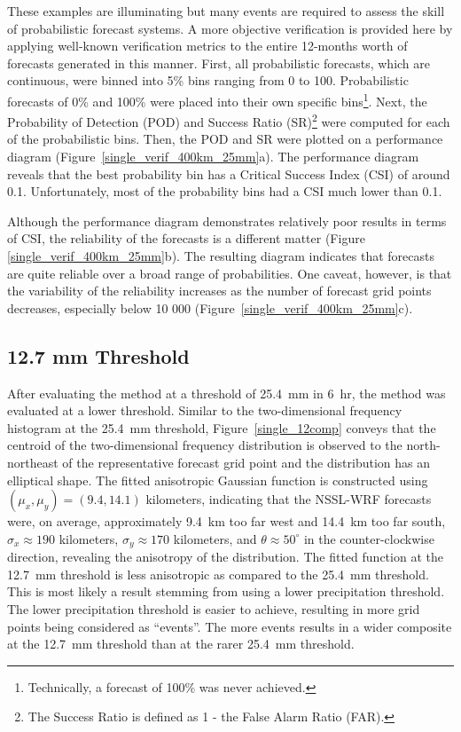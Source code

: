 These examples are illuminating but many events are required to assess the skill of probabilistic forecast systems.
A more objective verification is provided here by applying well-known verification metrics to the entire 12-months worth of forecasts generated in this manner.
First, all probabilistic forecasts, which are continuous, were binned into 5\% bins ranging from 0 to 100.
Probabilistic forecasts of 0\% and 100\% were placed into their own specific bins\footnote{Technically, a forecast of 100\% was never achieved.}.
Next, the Probability of Detection (POD) and Success Ratio (SR)\footnote{The Success Ratio is defined as 1 - the False Alarm Ratio (FAR).} were computed for each of the probabilistic bins.
Then, the POD and SR were plotted on a performance diagram \citep{Roebber2009} \mbox{(Figure \ref{single_verif_400km_25mm}a)}.
The performance diagram reveals that the best probability bin has a Critical Success Index (CSI) of around 0.1.
Unfortunately, most of the probability bins had a CSI much lower than 0.1.

Although the performance diagram demonstrates relatively poor results in terms of CSI, the reliability of the forecasts is a different matter (Figure \mbox{\ref{single_verif_400km_25mm}b)}.
The resulting diagram indicates that forecasts are quite reliable over a broad range of probabilities.
One caveat, however, is that the variability of the reliability increases as the number of forecast grid points decreases, especially below 10 000 \mbox{(Figure \ref{single_verif_400km_25mm}c)}.




\subsection{12.7 mm Threshold}
\label{dresults_12.7mm}

After evaluating the method at a threshold of \mbox{25.4 mm} in \mbox{6 hr}, the method was evaluated at a lower threshold.
Similar to the two-dimensional frequency histogram at the \mbox{25.4 mm} threshold, \mbox{Figure \ref{single_12comp}} conveys that the centroid of the two-dimensional frequency distribution is observed to the north-northeast of the representative forecast grid point and the distribution has an elliptical shape.
The fitted anisotropic Gaussian function is constructed using $(\mu_x, \mu_y) = (9.4, 14.1)$ kilometers, indicating that the NSSL-WRF forecasts were, on average, approximately \mbox{9.4 km} too far west and \mbox{14.4 km} too far south, $\sigma_x \approx 190$ kilometers, $\sigma_y \approx 170$ kilometers, and $\theta \approx 50^{\circ}$ in the counter-clockwise direction, revealing the anisotropy of the distribution.
The fitted function at the \mbox{12.7 mm} threshold is less anisotropic as compared to the \mbox{25.4 mm} threshold.
This is most likely a result stemming from using a lower precipitation threshold.
The lower precipitation threshold is easier to achieve, resulting in more grid points being considered as ``events''.
The more events results in a wider composite at the \mbox{12.7 mm} threshold than at the rarer \mbox{25.4 mm} threshold.


